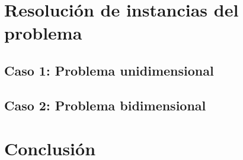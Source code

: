 \documentclass[12pt,paperletter]{article}
\begin{document}
\newpage
\section{Resolución de instancias del problema}

\subsection{Caso 1: Problema unidimensional }


\subsection{Caso 2: Problema bidimensional}




\newpage
\section{Conclusión}
\end{document}
